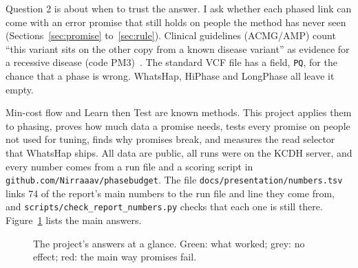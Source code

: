 \documentclass[11pt]{article}
\newcommand{\code}[1]{\texttt{#1}}
\begin{document}
Question 2 is about when to trust the answer. I ask whether each phased
link can come with an error promise that still holds on people the method
has never seen (Sections~\ref{sec:promise} to~\ref{sec:rule}). Clinical
guidelines (ACMG/AMP) count \enquote{this variant sits on the other copy from a
known disease variant} as evidence for a recessive disease (code
PM3)~\cite{richards2015}. The standard VCF file has a field, \code{PQ}, for
the chance that a phase is wrong. WhatsHap, HiPhase and LongPhase all leave
it empty.

Min-cost flow and Learn then Test are known methods. This project applies
them to phasing, proves how much data a promise needs, tests every promise
on people not used for tuning, finds why promises break, and measures the
read selector that WhatsHap ships. All data are public, all runs were on the
KCDH server, and every number comes from a run file and a scoring script in
\code{github.com/Nirraaav/phasebudget}. The file
\code{docs/presentation/numbers.tsv} links 74 of the report's main numbers
to the run file and line they come from, and
\code{scripts/check\_report\_numbers.py} checks that each one is still
there. Figure~\ref{fig:glance} lists the
main answers.

\begin{figure}[h]
\centering
{}
\caption{The project's answers at a glance. Green: what worked; grey: no
effect; red: the main way promises fail.}
\label{fig:glance}
\end{figure}
\end{document}

